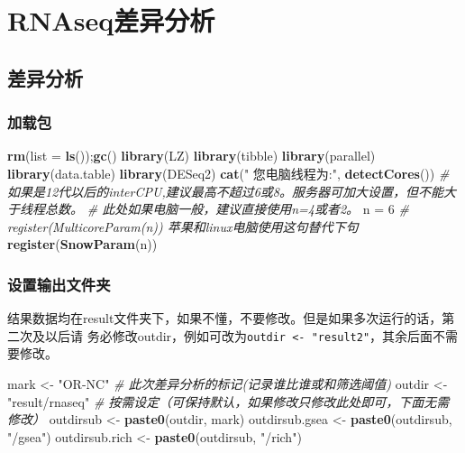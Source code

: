 \documentclass[
]{book}
\newenvironment{Shaded}{\begin{snugshade}}{\end{snugshade}}
\newcommand{\AttributeTok}[1]{\textcolor[rgb]{0.13,0.29,0.53}{#1}}
\newcommand{\CommentTok}[1]{\textcolor[rgb]{0.56,0.35,0.01}{\textit{#1}}}
\newcommand{\DecValTok}[1]{\textcolor[rgb]{0.00,0.00,0.81}{#1}}
\newcommand{\FunctionTok}[1]{\textcolor[rgb]{0.13,0.29,0.53}{\textbf{#1}}}
\newcommand{\NormalTok}[1]{#1}
\newcommand{\OtherTok}[1]{\textcolor[rgb]{0.56,0.35,0.01}{#1}}
\newcommand{\StringTok}[1]{\textcolor[rgb]{0.31,0.60,0.02}{#1}}
\begin{document}
\hypertarget{deg}{%
\chapter{RNAseq差异分析}\label{deg}}

\hypertarget{deg-mian}{%
\section{差异分析}\label{deg-mian}}

\hypertarget{ux52a0ux8f7dux5305}{%
\subsection{加载包}\label{ux52a0ux8f7dux5305}}

\begin{Shaded}
\begin{Highlighting}[]
\FunctionTok{rm}\NormalTok{(}\AttributeTok{list =} \FunctionTok{ls}\NormalTok{());}\FunctionTok{gc}\NormalTok{()}
\FunctionTok{library}\NormalTok{(LZ)}
\FunctionTok{library}\NormalTok{(tibble)}
\FunctionTok{library}\NormalTok{(parallel)}
\FunctionTok{library}\NormalTok{(data.table)}
\FunctionTok{library}\NormalTok{(DESeq2)}
\FunctionTok{cat}\NormalTok{(}\StringTok{" 您电脑线程为:"}\NormalTok{, }\FunctionTok{detectCores}\NormalTok{())}
\CommentTok{\# 如果是12代以后的interCPU,建议最高不超过6或8。服务器可加大设置，但不能大于线程总数。}
\CommentTok{\# 此处如果电脑一般，建议直接使用n=4或者2。}
\NormalTok{n }\OtherTok{=} \DecValTok{6}  
\CommentTok{\# register(MulticoreParam(n)) 苹果和linux电脑使用这句替代下句}
\FunctionTok{register}\NormalTok{(}\FunctionTok{SnowParam}\NormalTok{(n))}
\end{Highlighting}
\end{Shaded}

\hypertarget{ux8bbeux7f6eux8f93ux51faux6587ux4ef6ux5939}{%
\subsection{设置输出文件夹}\label{ux8bbeux7f6eux8f93ux51faux6587ux4ef6ux5939}}

结果数据均在result文件夹下，如果不懂，不要修改。但是如果多次运行的话，第二次及以后请
务必修改outdir，例如可改为\texttt{outdir\ \textless{}-\ "result2"}，其余后面不需要修改。

\begin{Shaded}
\begin{Highlighting}[]
\NormalTok{mark }\OtherTok{\textless{}{-}} \StringTok{"OR{-}NC"}  \CommentTok{\# 此次差异分析的标记(记录谁比谁或和筛选阈值)}
\NormalTok{outdir }\OtherTok{\textless{}{-}} \StringTok{"result/rnaseq"}  \CommentTok{\# 按需设定（可保持默认，如果修改只修改此处即可，下面无需修改）}
\NormalTok{outdirsub }\OtherTok{\textless{}{-}} \FunctionTok{paste0}\NormalTok{(outdir, mark)}
\NormalTok{outdirsub.gsea }\OtherTok{\textless{}{-}} \FunctionTok{paste0}\NormalTok{(outdirsub, }\StringTok{"/gsea"}\NormalTok{)}
\NormalTok{outdirsub.rich }\OtherTok{\textless{}{-}} \FunctionTok{paste0}\NormalTok{(outdirsub, }\StringTok{"/rich"}\NormalTok{)}
\end{Highlighting}
\end{Shaded}
\end{document}
